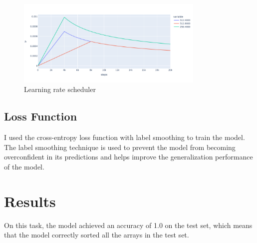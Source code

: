 \documentclass{article}
\begin{document}
\begin{figure}
    \centering
    \includegraphics[width=0.8\textwidth]
    {picture/optimizer.png}
    \caption{Learning rate scheduler}
    \label{Learning rate scheduler}
\end{figure}

\subsection{Loss Function}
I used the cross-entropy loss function with label smoothing to train the model. The label smoothing technique \cite{LabelSmoothing} is used to prevent the model from becoming overconfident in its predictions and helps improve the generalization performance of the model.



\section{Results}
On this task, the model achieved an accuracy of 1.0 on the test set, which means that the model correctly sorted all the arrays in the test set.
\end{document}
